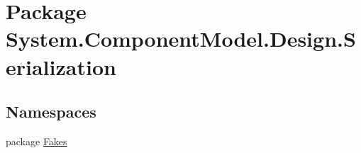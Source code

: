 \hypertarget{namespace_system_1_1_component_model_1_1_design_1_1_serialization}{\section{Package System.\-Component\-Model.\-Design.\-Serialization}
\label{namespace_system_1_1_component_model_1_1_design_1_1_serialization}
}
\subsection*{Namespaces}
\begin{DoxyCompactItemize}
\item 
package \hyperlink{namespace_system_1_1_component_model_1_1_design_1_1_serialization_1_1_fakes}{Fakes}
\end{DoxyCompactItemize}
